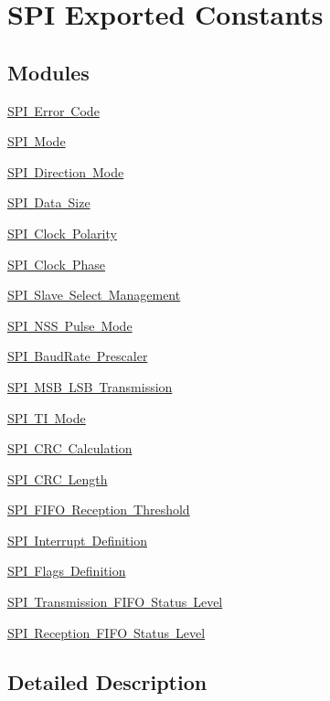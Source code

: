 \hypertarget{group___s_p_i___exported___constants}{}\section{S\+PI Exported Constants}
\label{group___s_p_i___exported___constants}
\subsection*{Modules}
\begin{DoxyCompactItemize}
\item 
\mbox{\hyperlink{group___s_p_i___error___code}{S\+P\+I Error Code}}
\item 
\mbox{\hyperlink{group___s_p_i___mode}{S\+P\+I Mode}}
\item 
\mbox{\hyperlink{group___s_p_i___direction}{S\+P\+I Direction Mode}}
\item 
\mbox{\hyperlink{group___s_p_i___data___size}{S\+P\+I Data Size}}
\item 
\mbox{\hyperlink{group___s_p_i___clock___polarity}{S\+P\+I Clock Polarity}}
\item 
\mbox{\hyperlink{group___s_p_i___clock___phase}{S\+P\+I Clock Phase}}
\item 
\mbox{\hyperlink{group___s_p_i___slave___select__management}{S\+P\+I Slave Select Management}}
\item 
\mbox{\hyperlink{group___s_p_i___n_s_s_p___mode}{S\+P\+I N\+S\+S Pulse Mode}}
\item 
\mbox{\hyperlink{group___s_p_i___baud_rate___prescaler}{S\+P\+I Baud\+Rate Prescaler}}
\item 
\mbox{\hyperlink{group___s_p_i___m_s_b___l_s_b__transmission}{S\+P\+I M\+S\+B L\+S\+B Transmission}}
\item 
\mbox{\hyperlink{group___s_p_i___t_i__mode}{S\+P\+I T\+I Mode}}
\item 
\mbox{\hyperlink{group___s_p_i___c_r_c___calculation}{S\+P\+I C\+R\+C Calculation}}
\item 
\mbox{\hyperlink{group___s_p_i___c_r_c__length}{S\+P\+I C\+R\+C Length}}
\item 
\mbox{\hyperlink{group___s_p_i___f_i_f_o__reception__threshold}{S\+P\+I F\+I\+F\+O Reception Threshold}}
\item 
\mbox{\hyperlink{group___s_p_i___interrupt__definition}{S\+P\+I Interrupt Definition}}
\item 
\mbox{\hyperlink{group___s_p_i___flags__definition}{S\+P\+I Flags Definition}}
\item 
\mbox{\hyperlink{group___s_p_i__transmission__fifo__status__level}{S\+P\+I Transmission F\+I\+F\+O Status Level}}
\item 
\mbox{\hyperlink{group___s_p_i__reception__fifo__status__level}{S\+P\+I Reception F\+I\+F\+O Status Level}}
\end{DoxyCompactItemize}


\subsection{Detailed Description}
